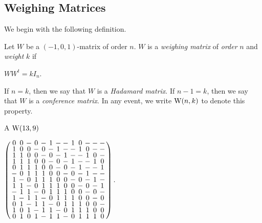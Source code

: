 \documentclass[../../../main]{subfiles}
\begin{document}

\subsection{Weighing Matrices}

We begin with the following definition.

\begin{defin}\label{weighing matrix}
  Let $W$ be a $(-1,0,1)$-matrix of order $n$. $W$ is a {\it weighing matrix} of {\it order} $n$ and {\it weight} $k$ if
  \begin{defenum}
  \item $WW^t = kI_n$.
  \end{defenum}
  If $n=k$, then we say that $W$ is a {\it Hadamard matrix}. If $n-1=k$, then we say that $W$ is a {\it conference matrix}. In any event, we write $\text{W}(n,k)$ to denote this property.
\end{defin}

\begin{ex}
  A $\text{W}(13,9)$
  \begin{defenum}
  \item\label{ex-balanced-w-matrix} $
    \left(
      \arraycolsep=1.25pt\def\arraystretch{0.625}
      \begin{array}{ccccccccccccc}
        0&0&-&0&-&1&-&-&1&0&-&-&-\\
        1&0&0&-&0&-&1&-&-&1&0&-&-\\
        1&1&0&0&-&0&-&1&-&-&1&0&-\\
        1&1&1&0&0&-&0&-&1&-&-&1&0\\
        0&1&1&1&0&0&-&0&-&1&-&-&1\\
        -&0&1&1&1&0&0&-&0&-&1&-&-\\
        1&-&0&1&1&1&0&0&-&0&-&1&-\\
        1&1&-&0&1&1&1&0&0&-&0&-&1\\
        -&1&1&-&0&1&1&1&0&0&-&0&-\\
        1&-&1&1&-&0&1&1&1&0&0&-&0\\
        0&1&-&1&1&-&0&1&1&1&0&0&-\\
        1&0&1&-&1&1&-&0&1&1&1&0&0\\
        0&1&0&1&-&1&1&-&0&1&1&1&0\\
      \end{array}
    \right).
    $
  \end{defenum}
\end{ex}
\end{document}
